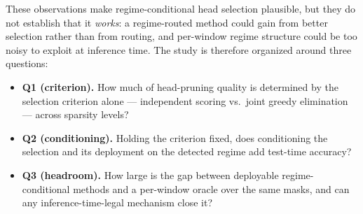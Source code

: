 These observations make regime-conditional head selection plausible, but
they do not establish that it \emph{works}: a regime-routed method could
gain from better selection rather than from routing, and per-window
regime structure could be too noisy to exploit at inference time. The
study is therefore organized around three questions:
\begin{itemize}
  \item \textbf{Q1 (criterion).} How much of head-pruning quality is
  determined by the selection criterion alone --- independent scoring
  vs.\ joint greedy elimination --- across sparsity levels?
  \item \textbf{Q2 (conditioning).} Holding the criterion fixed, does
  conditioning the selection and its deployment on the detected regime
  add test-time accuracy?
  \item \textbf{Q3 (headroom).} How large is the gap between deployable
  regime-conditional methods and a per-window oracle over the same
  masks, and can any inference-time-legal mechanism close it?
\end{itemize}
